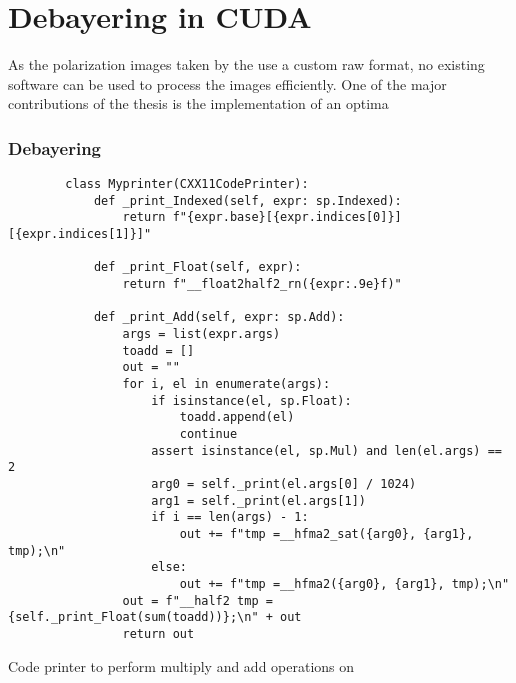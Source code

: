 
\chapter{Debayering in CUDA}
As the polarization images taken by the \cams use a custom raw format, no existing software can be used to process the images efficiently.
One of the major contributions of the thesis is the implementation of an optima


\subsection{Debayering}
\cite{getreuerMalvarHeCutlerLinearImage2011}

\begin{listing}[H]
    \begin{verbatim}
        class Myprinter(CXX11CodePrinter):
            def _print_Indexed(self, expr: sp.Indexed):
                return f"{expr.base}[{expr.indices[0]}][{expr.indices[1]}]"

            def _print_Float(self, expr):
                return f"__float2half2_rn({expr:.9e}f)"

            def _print_Add(self, expr: sp.Add):
                args = list(expr.args)
                toadd = []
                out = ""
                for i, el in enumerate(args):
                    if isinstance(el, sp.Float):
                        toadd.append(el)
                        continue
                    assert isinstance(el, sp.Mul) and len(el.args) == 2
                    arg0 = self._print(el.args[0] / 1024)
                    arg1 = self._print(el.args[1])
                    if i == len(args) - 1:
                        out += f"tmp =__hfma2_sat({arg0}, {arg1}, tmp);\n"
                    else:
                        out += f"tmp =__hfma2({arg0}, {arg1}, tmp);\n"
                out = f"__half2 tmp = {self._print_Float(sum(toadd))};\n" + out
                return out
        \end{verbatim}
    \caption{Code printer to perform multiply and add operations on \halftwo}
\end{listing}

